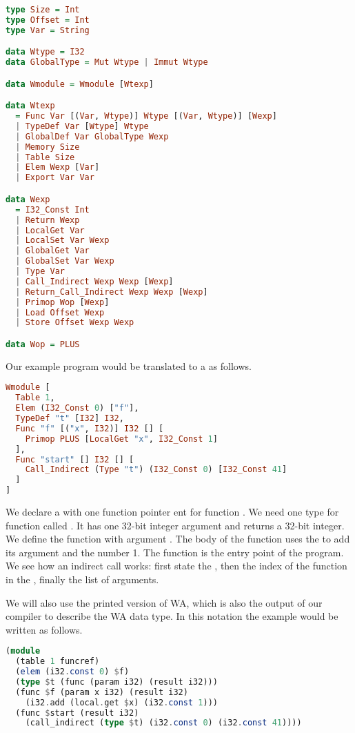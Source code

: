 {\begin{lstlisting}[language=Haskell]
type Size = Int
type Offset = Int
type Var = String

data Wtype = I32
data GlobalType = Mut Wtype | Immut Wtype

data Wmodule = Wmodule [Wtexp]

data Wtexp
  = Func Var [(Var, Wtype)] Wtype [(Var, Wtype)] [Wexp]
  | TypeDef Var [Wtype] Wtype
  | GlobalDef Var GlobalType Wexp
  | Memory Size
  | Table Size
  | Elem Wexp [Var]
  | Export Var Var

data Wexp
  = I32_Const Int
  | Return Wexp
  | LocalGet Var
  | LocalSet Var Wexp
  | GlobalGet Var
  | GlobalSet Var Wexp
  | Type Var
  | Call_Indirect Wexp Wexp [Wexp]
  | Return_Call_Indirect Wexp Wexp [Wexp]
  | Primop Wop [Wexp]
  | Load Offset Wexp
  | Store Offset Wexp Wexp

data Wop = PLUS
\end{lstlisting}

Our example program  would be translated to a  as follows.

\begin{lstlisting}[language=Haskell]
Wmodule [
  Table 1,
  Elem (I32_Const 0) ["f"],
  TypeDef "t" [I32] I32,
  Func "f" [("x", I32)] I32 [] [
    Primop PLUS [LocalGet "x", I32_Const 1]
  ],
  Func "start" [] I32 [] [
    Call_Indirect (Type "t") (I32_Const 0) [I32_Const 41]
  ]
]
\end{lstlisting}

We declare a  with one function pointer ent for function . We need one type for function  called . It has one 32-bit integer argument and returns a 32-bit integer. We define the function  with argument . The body of the function uses the   to add its argument and the number 1. The function  is the entry point of the program. We see how an indirect call works: first state the , then the index of the function in the , finally the list of arguments.

We will also use the printed version of \ac{WA}, which is also the output of our compiler to describe the \ac{WA} data type. In this notation the example would be written as follows.

\begin{lstlisting}[language=Haskell]
(module
  (table 1 funcref)
  (elem (i32.const 0) $f)
  (type $t (func (param i32) (result i32)))
  (func $f (param x i32) (result i32)
    (i32.add (local.get $x) (i32.const 1)))
  (func $start (result i32)
    (call_indirect (type $t) (i32.const 0) (i32.const 41))))
\end{lstlisting}

}
